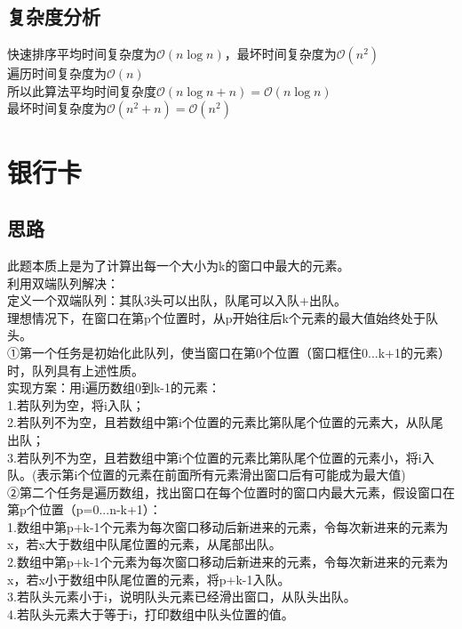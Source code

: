 \documentclass[UTF8]{ctexart}
\begin{document}
\subsection{复杂度分析}
快速排序平均时间复杂度为{$\mathcal{O}(n\log n)$}，最坏时间复杂度为{$\mathcal{O}(n^2)$}\\
遍历时间复杂度为{$\mathcal{O}(n)$}\\
所以此算法平均时间复杂度{$\mathcal{O}(n\log n+n)=\mathcal{O}(n\log n)$}\\
最坏时间复杂度为{$\mathcal{O}(n^2+ n)=\mathcal{O}(n^2)$}
\newpage
\section{银行卡}
\subsection{思路}
此题本质上是为了计算出每一个大小为k的窗口中最大的元素。\\
利用双端队列解决：\\
定义一个双端队列：其队3头可以出队，队尾可以入队+出队。\\
理想情况下，在窗口在第p个位置时，从p开始往后k个元素的最大值始终处于队头。\\
①第一个任务是初始化此队列，使当窗口在第0个位置（窗口框住0...k+1的元素）时，队列具有上述性质。\\
实现方案：用i遍历数组0到k-1的元素：\\
1.若队列为空，将i入队；\\
2.若队列不为空，且若数组中第i个位置的元素比第队尾个位置的元素大，从队尾出队；\\
3.若队列不为空，且若数组中第i个位置的元素比第队尾个位置的元素小，将i入队。(表示第i个位置的元素在前面所有元素滑出窗口后有可能成为最大值)\\
②第二个任务是遍历数组，找出窗口在每个位置时的窗口内最大元素，假设窗口在第p个位置（p=0...n-k+1）：\\
1.数组中第p+k-1个元素为每次窗口移动后新进来的元素，令每次新进来的元素为x，若x大于数组中队尾位置的元素，从尾部出队。\\
2.数组中第p+k-1个元素为每次窗口移动后新进来的元素，令每次新进来的元素为x，若x小于数组中队尾位置的元素，将p+k-1入队。\\
3.若队头元素小于i，说明队头元素已经滑出窗口，从队头出队。\\
4.若队头元素大于等于i，打印数组中队头位置的值。
\end{document}
